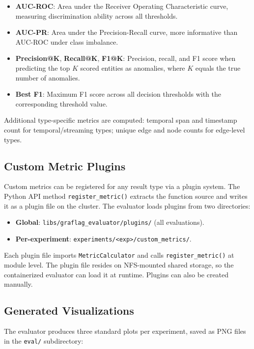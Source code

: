 \documentclass[twoside,11pt]{article}
\begin{document}
\begin{itemize}[nosep,leftmargin=*]
\item \textbf{AUC-ROC}: Area under the Receiver Operating Characteristic curve, measuring discrimination ability across all thresholds.
\item \textbf{AUC-PR}: Area under the Precision-Recall curve, more informative than AUC-ROC under class imbalance.
\item \textbf{Precision@K}, \textbf{Recall@K}, \textbf{F1@K}: Precision, recall, and F1 score when predicting the top $K$ scored entities as anomalies, where $K$ equals the true number of anomalies.
\item \textbf{Best F1}: Maximum F1 score across all decision thresholds with the corresponding threshold value.
\end{itemize}

Additional type-specific metrics are computed: temporal span and timestamp count for temporal/streaming types; unique edge and node counts for edge-level types.

\subsection{Custom Metric Plugins}

Custom metrics can be registered for any result type via a plugin system. The Python API method \texttt{register\_metric()} extracts the function source and writes it as a plugin file on the cluster. The evaluator loads plugins from two directories:

\begin{itemize}[nosep,leftmargin=*]
\item \textbf{Global}: \texttt{libs/graflag\_evaluator/plugins/} (all evaluations).
\item \textbf{Per-experiment}: \texttt{experiments/<exp>/custom\_metrics/}.
\end{itemize}

Each plugin file imports \texttt{MetricCalculator} and calls \texttt{register\_metric()} at module level. The plugin file resides on NFS-mounted shared storage, so the containerized evaluator can load it at runtime. Plugins can also be created manually.

\subsection{Generated Visualizations}

The evaluator produces three standard plots per experiment, saved as PNG files in the \texttt{eval/} subdirectory:
\end{document}
